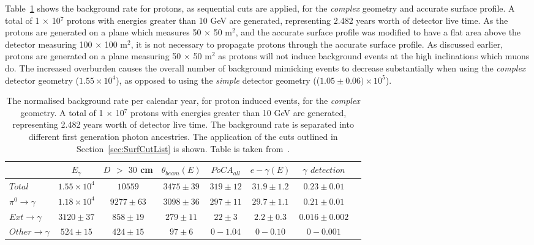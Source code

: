 Table~\ref{tab:SurfProComp} shows the background rate for protons, as sequential cuts are applied, for the \emph{complex} geometry and accurate surface profile. A total of 1 $\times$ 10$^7$ protons with energies greater than 10 GeV are generated, representing 2.482 years worth of detector live time. As the protons are generated on a plane which measures 50 $\times$ 50 m$^{2}$, and the accurate surface profile was modified to have a flat area above the detector measuring 100 $\times$ 100 m$^{2}$, it is not necessary to propagate protons through the accurate surface profile. As discussed earlier, protons are generated on a plane measuring 50 $\times$ 50 m$^{2}$ as protons will not induce background events at the high inclinations which muons do. The increased overburden causes the overall number of background mimicking events to decrease substantially when using the \emph{complex} detector geometry ($1.55\times10^4$), as opposed to using the \emph{simple} detector geometry (($1.05\pm0.06)\times10^5$). \\

\begin{table}
  \caption[The normalised background rate per calendar year, for proton induced events, for the \emph{complex} geometry]
          {The normalised background rate per calendar year, for proton induced events, for the \emph{complex} geometry. A total of 1 $\times$ 10$^7$ protons with energies greater than 10 GeV are generated, representing 2.482 years worth of detector live time. The background rate is separated into different first generation photon ancestries. The application of the cuts outlined in Section~\ref{sec:SurfCutList} is shown. Table is taken from~\citep{MartinsThesis}.}
  \label{tab:SurfProComp}
  \centering
  \scriptsize
  \begin{tabular}{l c c c c c c c }
    \toprule
        & $E_\gamma$ &  $D$ $>$ $30$ cm & $\theta_{beam}(E)$ & $PoCA_{all}$ & $e-\gamma(E)$ & $\gamma$ $detection$ \\
        \midrule
        $Total$          & $1.55\times10^4$ & $10559$      & $3475\pm39$ & $319\pm12$ & $31.9\pm1.2$ & $0.23\pm0.01$ \\

        $\pi^0\to\gamma$ & $1.18\times10^4$ & $9277\pm63$  & $3098\pm36$ & $297\pm11$ & $29.7\pm1.1$ & $0.21\pm0.01$ \\

        $Ext\to\gamma$   & $3120\pm37$      & $858\pm19$   & $279\pm11$  & $22\pm3$   & $2.2\pm0.3$  & $0.016\pm0.002$ \\

        $Other\to\gamma$ & $524\pm15$       & $424\pm15$   & $97\pm6$    & $0-1.04$   & $0-0.10$     & $0-0.001$ \\
        \bottomrule
  \end{tabular}
\end{table}

